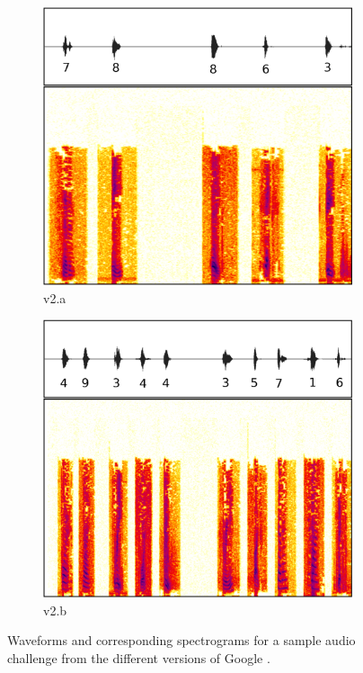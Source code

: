 \begin{figure}[tp]
\begin{subfigure}{0.23\textwidth}
        \includegraphics[width=\textwidth]{figures/recaptcha2a.pdf}
        \caption{\re v2.a}
        \label{fig:recaptcha2a}
\end{subfigure}\hspace{0.01\textwidth}
\begin{subfigure}{0.23\textwidth}
        \includegraphics[width=\textwidth]{figures/recaptcha2b.pdf}
        \caption{\re v2.b}
        \label{fig:recaptcha2b}
\end{subfigure}
\caption{Waveforms and corresponding spectrograms for a sample audio challenge from the different versions of Google \re.}
\label{fig:examples}
\end{figure}


